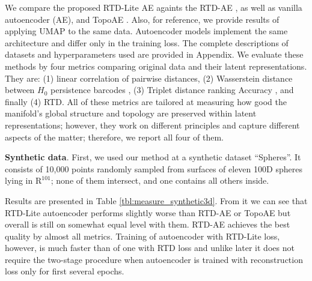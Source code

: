 \documentclass[twoside]{article}
\begin{document}
We compare the proposed RTD-Lite AE againts the  RTD-AE \cite{trofimov2023learning}, as well as vanilla autoencoder (AE), and TopoAE \cite{moor2020topological}. Also, for reference, we provide results of applying UMAP \cite{damrich2021umap} to the same data. Autoencoder models implement the same architecture and differ only in the training loss. The complete descriptions of datasets and hyperparameters used are provided in Appendix. We evaluate these methods by four metrics comparing original data and their latent representations. They are: (1) linear correlation of pairwise distances, (2) Wasserstein distance between $H_0$ persistence barcodes \cite{chazal2021introduction}, (3) Triplet distance ranking Accuracy \cite{wang2021understanding}, and finally (4) RTD. All of these metrics are tailored at measuring how good the manifold's global structure and topology are preserved within latent representations; however, they work on different principles and capture different aspects of the matter; therefore, we report all four of them.

\textbf{Synthetic data}.
First, we used our method at a synthetic dataset ``Spheres''. It consists of 10,000 points randomly sampled from surfaces of eleven 100D spheres lying in $\mathrm{R}^{101}$; none of them intersect, and one contains all others inside.

Results are presented in Table \ref{tbl:measure_synthetic3d}. From it we can see that
RTD-Lite autoencoder performs slightly worse than RTD-AE or TopoAE but overall is still on somewhat equal level with them. RTD-AE achieves the best quality by almost all metrics. Training of autoencoder with RTD-Lite loss, however, is much faster than of one with RTD loss and unlike later it does not require the two-stage procedure when autoencoder is trained with reconstruction loss only for first several epochs.
\end{document}
